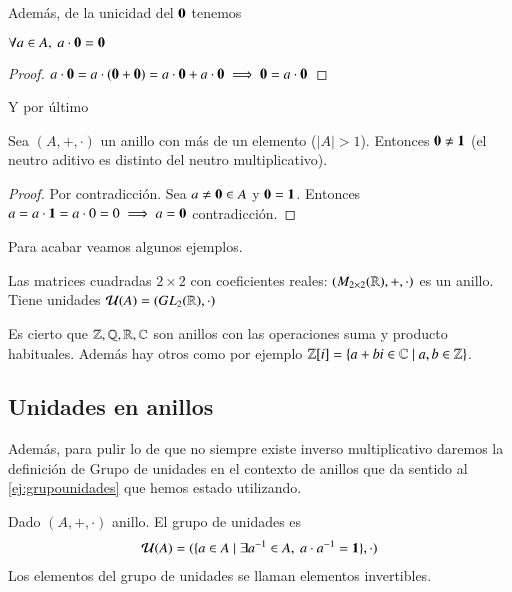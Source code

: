 Además, de la unicidad del $\mathbf{0}$ tenemos

\begin{pro}
	$\forall a \in A,\ a\cdot \mathbf{0} = \mathbf{0}$
\end{pro}

\begin{proof}
	$a \cdot \mathbf{0} = a \cdot(\mathbf{0} + \mathbf{0}) = a\cdot \mathbf{0} + a\cdot \mathbf{0} \implies \mathbf{0} = a\cdot \mathbf{0}$
\end{proof}

Y por último

\begin{pro}
	Sea $(A, +, \cdot)$ un anillo con más de un elemento ($|A| > 1$). Entonces $\mathbf{0} \neq \mathbf{1}$ (el neutro aditivo es distinto del neutro multiplicativo).
\end{pro}

\begin{proof}
	Por contradicción. Sea $a \neq \mathbf{0} \in A$ y $\mathbf{0} = \mathbf{1}$. Entonces $a = a\cdot \mathbf{1} = a\cdot 0 = 0 \implies a = \mathbf{0}$ contradicción.
\end{proof}

Para acabar veamos algunos ejemplos.

\begin{ej}
	Las matrices cuadradas $2\times 2$ con coeficientes reales: $(M_{2\times 2}(\mathbb{R}), +, \cdot)$ es un anillo. Tiene unidades $\mathcal{U}(A) = (GL_2(\mathbb{R}), \cdot)$
\end{ej}

\begin{ej}
	Es cierto que $\mathbb{Z}, \mathbb{Q}, \mathbb{R}, \mathbb{C}$ son anillos con las operaciones suma y producto habituales. Además hay otros como por ejemplo $\mathbb{Z}[i] = \{a+bi \in \mathbb{C} \mid a,b \in \mathbb{Z}\}$.
\end{ej}


\subsection{Unidades en anillos}

Además, para pulir lo de que no siempre existe inverso multiplicativo daremos la definición de Grupo de unidades en el contexto de anillos que da sentido al \autoref{ej:grupounidades} que hemos estado utilizando.

\begin{dfn}
	Dado $(A, +, \cdot)$ anillo. El grupo de unidades es
	\begin{align}
		\mathcal{U}(A) = (\{a \in A \mid \exists a^{-1} \in A,\ a\cdot a^{-1} = \mathbf{1}\}, \cdot)
	\end{align}
	Los elementos del grupo de unidades se llaman elementos invertibles.
\end{dfn}

